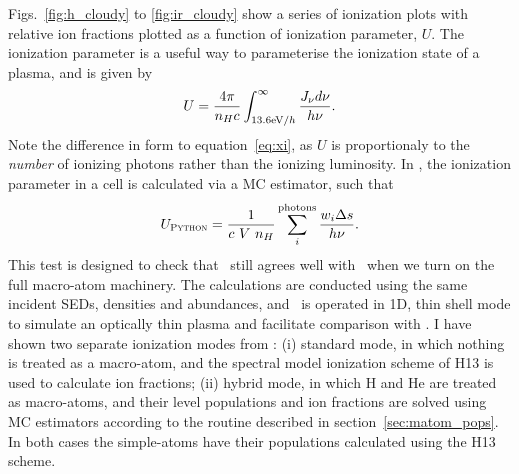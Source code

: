 Figs.~\ref{fig:h_cloudy} to \ref{fig:ir_cloudy} show a series of 
ionization plots with relative ion fractions plotted as a function of
ionization parameter, $U$. The ionization parameter is a useful
way to parameterise the ionization state of a plasma, and is given by
\begin{equation}
U = \frac{4\pi}{n_H c}\int_{13.6{\rm{eV}} / h}^{\infty}\frac{{J_{\nu}d\nu}}{h\nu}.
\label{eq:ip}
\end{equation}
Note the difference in form to equation~\ref{eq:xi}, as $U$ is proportionaly to
the {\em number} of ionizing photons rather than the ionizing luminosity.
In \py, the ionization parameter in a cell 
is calculated via a MC estimator, such that
\begin{equation}
U_{\textsc{Python}} = \frac{1}{c~V~n_H} \sum_i^{\mathrm{photons}} \frac{w_i \Delta s}{h \nu}.
\end{equation}
This test is designed to check that \py\ still agrees
well with \cld\ when we turn on the full macro-atom machinery.
The calculations are conducted using the same 
incident SEDs, densities and abundances, and \py\ is operated in
1D, thin shell mode to simulate an optically thin plasma and facilitate
comparison with \cld. I have shown two separate ionization modes
from \py: (i) standard mode, in which nothing is treated as a macro-atom,
and the spectral model ionization scheme of H13 is used to calculate
ion fractions; (ii) hybrid mode, in which H and He are treated as 
macro-atoms, and their level populations and ion fractions are solved
using MC estimators according to the routine
described in section~\ref{sec:matom_pops}. In both 
cases the simple-atoms have their populations calculated using the H13 scheme.
\index{\cld}


